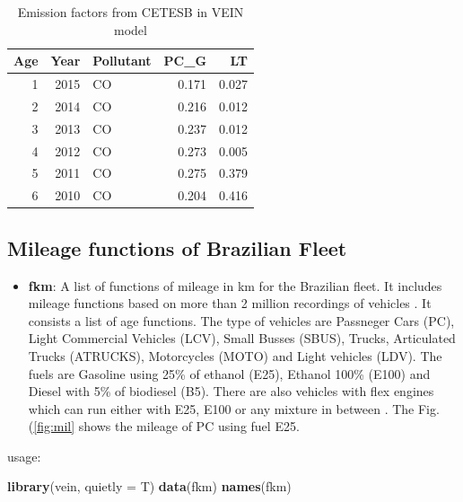 \documentclass[12pt,graybox,envcountchap,sectrefs]{krantz}
\makeatletter
\newenvironment{Shaded}{\begin{snugshade}}{\end{snugshade}}
\newcommand{\KeywordTok}[1]{\textcolor[rgb]{0.13,0.29,0.53}{\textbf{#1}}}
\newcommand{\DataTypeTok}[1]{\textcolor[rgb]{0.13,0.29,0.53}{#1}}
\newcommand{\NormalTok}[1]{#1}
\providecommand{\tightlist}{%
  \setlength{\itemsep}{0pt}\setlength{\parskip}{0pt}}
\newenvironment{kframe}{%
\medskip{}
\setlength{\fboxsep}{.8em}
 \def\at@end@of@kframe{}%
 \ifinner\ifhmode%
  \def\at@end@of@kframe{\end{minipage}}%
  \begin{minipage}{\columnwidth}%
 \fi\fi%
 \def\FrameCommand##1{\hskip\@totalleftmargin \hskip-\fboxsep
 \colorbox{shadecolor}{##1}\hskip-\fboxsep
     \hskip-\linewidth \hskip-\@totalleftmargin \hskip\columnwidth}%
 \MakeFramed {\advance\hsize-\width
   \@totalleftmargin\z@ \linewidth\hsize
   \@setminipage}}%
 {\par\unskip\endMakeFramed%
 \at@end@of@kframe}
\renewenvironment{Shaded}{\begin{kframe}}{\end{kframe}}
\theoremstyle{definition}
\theoremstyle{definition}
\theoremstyle{definition}
\theoremstyle{remark}
\makeatother
\begin{document}
\begin{table}

\caption{\label{tab:unnamed-chunk-11}Emission factors from CETESB in VEIN model}
\centering
\begin{tabular}[t]{rrlrr}
\toprule
Age & Year & Pollutant & PC\_G & LT\\
\midrule
1 & 2015 & CO & 0.171 & 0.027\\
2 & 2014 & CO & 0.216 & 0.012\\
3 & 2013 & CO & 0.237 & 0.012\\
4 & 2012 & CO & 0.273 & 0.005\\
5 & 2011 & CO & 0.275 & 0.379\\
6 & 2010 & CO & 0.204 & 0.416\\
\bottomrule
\end{tabular}
\end{table}

\subsection{Mileage functions of Brazilian
Fleet}\label{mileage-functions-of-brazilian-fleet}

\begin{itemize}
\tightlist
\item
  \textbf{fkm}: A list of functions of mileage in km for the Brazilian
  fleet. It includes mileage functions based on more than 2 million
  recordings of vehicles \citep{BruniBales2013}. It consists a list of
  age functions. The type of vehicles are Passneger Cars (PC), Light
  Commercial Vehicles (LCV), Small Busses (SBUS), Trucks, Articulated
  Trucks (ATRUCKS), Motorcycles (MOTO) and Light vehicles (LDV). The
  fuels are Gasoline using 25\% of ethanol (E25), Ethanol 100\% (E100)
  and Diesel with 5\% of biodiesel (B5). There are also vehicles with
  flex engines which can run either with E25, E100 or any mixture in
  between \citep{2005-01-4130}. The Fig. (\ref{fig:mil} shows the
  mileage of PC using fuel E25.
\end{itemize}

usage:

\begin{Shaded}
\begin{Highlighting}[]
\KeywordTok{library}\NormalTok{(vein, }\DataTypeTok{quietly =}\NormalTok{ T)}
\KeywordTok{data}\NormalTok{(fkm)}
\KeywordTok{names}\NormalTok{(fkm)}
\end{Highlighting}
\end{Shaded}
\end{document}
